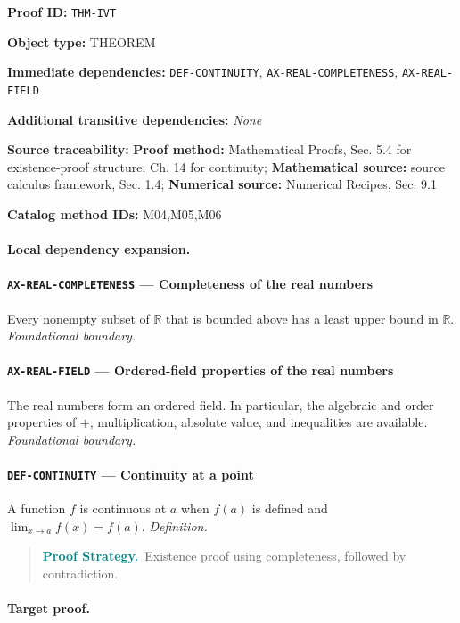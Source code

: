 \documentclass[10pt]{article}
\newcommand{\pidraw}[1]{\begingroup\urlstyle{tt}\nolinkurl{#1}\endgroup}
\theoremstyle{definition}
\theoremstyle{remark}
\newenvironment{proofstrategy}
{\begin{quote}\small\noindent\textbf{\textcolor{teal}{Proof Strategy.}}\ }
{\end{quote}}
\newcommand{\meta}[2]{\noindent\textbf{#1:} #2\par}
\begin{document}
\meta{Proof ID}{\pidraw{THM-IVT}}
\meta{Object type}{THEOREM}
\meta{Immediate dependencies}{\pidraw{DEF-CONTINUITY}, \pidraw{AX-REAL-COMPLETENESS}, \pidraw{AX-REAL-FIELD}}
\meta{Additional transitive dependencies}{\emph{None}}
\meta{Source traceability}{\textbf{Proof method:} Mathematical Proofs, Sec. 5.4 for existence-proof structure; Ch. 14 for continuity; \textbf{Mathematical source:} source calculus framework, Sec. 1.4; \textbf{Numerical source:} Numerical Recipes, Sec. 9.1}
\meta{Catalog method IDs}{M04,M05,M06}

\paragraph{Local dependency expansion.}

\paragraph{\pidraw{AX-REAL-COMPLETENESS} --- Completeness of the real numbers}
Every nonempty subset of $\mathbb{R}$ that is bounded above has a least upper bound in $\mathbb{R}$.
\textit{Foundational boundary.}

\paragraph{\pidraw{AX-REAL-FIELD} --- Ordered-field properties of the real numbers}
The real numbers form an ordered field. In particular, the algebraic and order properties of $+$, multiplication, absolute value, and inequalities are available.
\textit{Foundational boundary.}

\paragraph{\pidraw{DEF-CONTINUITY} --- Continuity at a point}
A function $f$ is continuous at $a$ when $f(a)$ is defined and $\lim_{x\to a}f(x)=f(a)$.
\textit{Definition.}

\begin{proofstrategy}Existence proof using completeness, followed by contradiction.\end{proofstrategy}

\paragraph{Target proof.}
\end{document}
